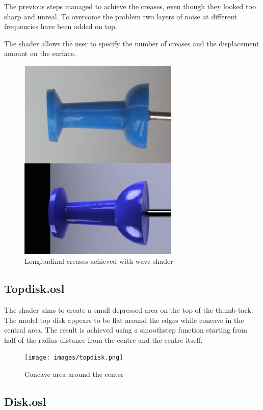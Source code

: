\documentclass[tog]{acmsiggraph}
\begin{document}
The previous steps managed to achieve the creases, even though they looked too sharp and unreal. To overcome the problem two layers of noise at different frequencies have been added on top.

The shader allows the user to specify the number of creases and the displacement amount on the surface.

\begin{figure}[ht]
  \centering
  \includegraphics[width=3.0in]{images/wave.png}
  \caption{Longitudinal creases achieved with wave shader}
  \label{fig:wave}
\end{figure}

\subsection{Topdisk.osl}

The shader aims to create a small depressed area on the top of the thumb tack. The model top disk appears to be flat around the edges while concave in the central area. The result is achieved using a smoothstep function starting from half of the radius distance from the centre and the centre itself.

\begin{figure}[h!]
  \centering
  \texttt{[image: images/topdisk.png]}
  \caption{Concave area around the center}
  \label{fig:topdisk}
\end{figure}

\newpage
\subsection{Disk.osl}
\end{document}
